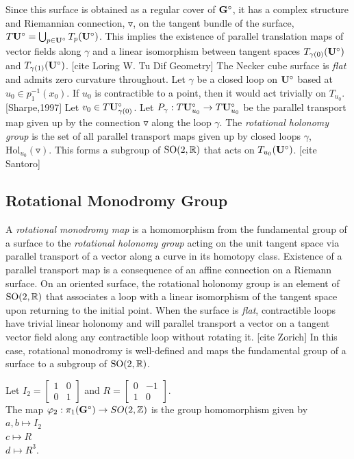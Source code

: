 \documentclass[a4paper, 11pt]{article}
\def\SO{\mathrm{SO}}
\begin{document}
Since this surface is obtained as a regular cover of $\mathbf{G}^\circ$, it has a complex structure and Riemannian connection, $\triangledown$, on the tangent bundle of the surface, $T\mathbf{U}^\circ=\bigcup_{p\in\mathbf{U}^\circ}T_{p}(\mathbf{U}^\circ)$. This implies the existence of parallel translation maps of vector fields along $\gamma$ and a linear isomorphism between tangent spaces $T_{\gamma(0)}(\mathbf{U}^\circ)$ and $T_{\gamma(1)}(\mathbf{U}^\circ)$. [cite Loring W. Tu Dif Geometry] The Necker cube surface is \emph{flat} and admits zero curvature throughout. Let $\gamma$ be a closed loop on $\mathbf{U}^\circ$ based at $u_0\in p_1^{-1}(x_0)$. If $u_0$ is contractible to a point, then it would act trivially on $T_{u_0}$. [Sharpe,1997] Let $v_0\in T\mathbf{U}^\circ_{\gamma(0)}$. Let $P_\gamma:T\mathbf{U}^\circ_{u_0}\rightarrow T\mathbf{U}^\circ_{u_0}$ be the parallel transport map given up by the connection $\triangledown$ along the loop $\gamma$. The \emph{rotational holonomy group} is the set of all parallel transport maps given up by closed loops $\gamma$, $\text{Hol}_{u_0}(\triangledown)$. This forms a subgroup of $\SO(2,\RR)$ that acts on $T_{u_0}(\mathbf{U}^\circ)$. [cite Santoro] 


\subsection{Rotational Monodromy Group}
A \emph{rotational monodromy map} is a homomorphism from the fundamental group of a surface to the \emph{rotational holonomy group} acting on the unit tangent space via parallel transport of a vector along a curve in its homotopy class. Existence of a parallel transport map is a consequence of an affine connection on a Riemann surface. On an oriented surface, the rotational holonomy group is an element of $\SO(2,\RR)$ that associates a loop with a linear isomorphism of the tangent space upon returning to the initial point. When the surface is \emph{flat}, contractible loops have trivial linear holonomy and will parallel transport a vector on a tangent vector field along any contractible loop without rotating it. [cite Zorich] In this case, rotational monodromy is well-defined and maps the fundamental group of a surface to a subgroup of $\SO(2,\RR)$.

\begin{Def}
Let $I_2=\begin{bmatrix}1 & 0\\0 & 1\end{bmatrix}$ and $R=\begin{bmatrix}0 & -1 \\1 & 0\end{bmatrix}$. \\
The map $\varphi_2:\pi_1(\mathbf{G}^\circ)\rightarrow SO(2,\mathbb{Z})$ is the group homomorphism given by \\$a,b \mapsto I_2$ \\$c  \mapsto R$\\$d  \mapsto R^3$.
\end{Def}
\end{document}
